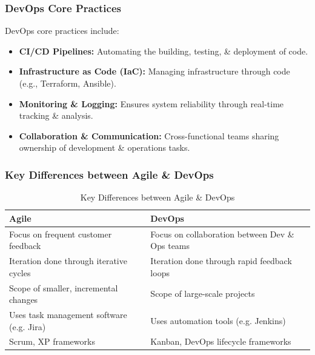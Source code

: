 \documentclass[a4paper,11pt]{article}
\begin{document}
\subsubsection{DevOps Core Practices}
DevOps core practices include:
\begin{itemize}
    \item   \textbf{CI/CD Pipelines:} Automating the building, testing, \& deployment of code.
    \item   \textbf{Infrastructure as Code (IaC):} Managing infrastructure through code (e.g., Terraform, Ansible).
    \item   \textbf{Monitoring \& Logging:} Ensures system reliability through real-time tracking \& analysis.
    \item   \textbf{Collaboration \& Communication:} Cross-functional teams sharing ownership of development \& operations tasks.
\end{itemize}

\subsubsection{Key Differences between Agile \& DevOps}
\begin{table}[h!]
    \centering

    \begin{tabular}{|>{\arraybackslash}p{}|>{\arraybackslash}p{}|}
        \hline
        \textbf{Agile}                                                              & \textbf{DevOps} \\
        \hline
        Focus on frequent customer feedback                                         & Focus on collaboration between Dev \& Ops teams \\
        \hline
        Iteration done through iterative cycles                                     & Iteration done through rapid feedback loops \\
        \hline
        Scope of smaller, incremental changes                                       & Scope of large-scale projects \\
        \hline
        Uses task management software (e.g. Jira)                                   & Uses automation tools (e.g. Jenkins) \\
        \hline
        Scrum, XP frameworks                                                        & Kanban, DevOps lifecycle frameworks \\
        \hline
    \end{tabular}
    \caption{Key Differences between Agile \& DevOps}
\end{table}
\end{document}

